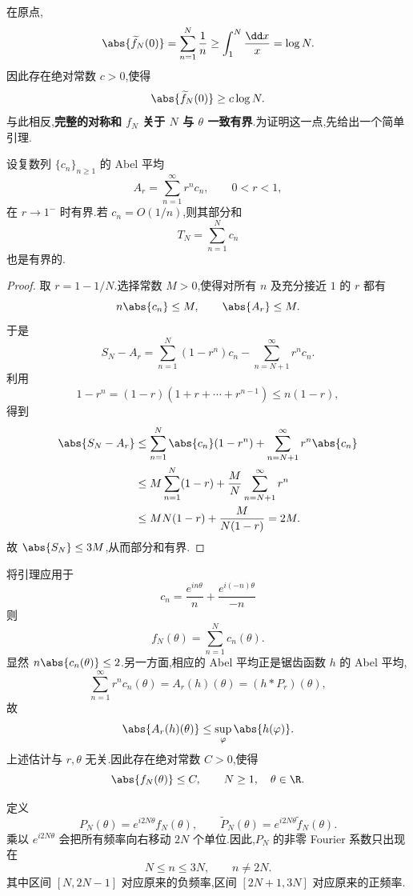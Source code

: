 在原点,
\[
\abs{\widetilde f_N(0)}
=
\sum_{n=1}^{N}\frac1n
\geq
\int_1^N\frac{\dd x}{x}
=
\log N.
\]
因此存在绝对常数 $c>0$,使得
\begin{equation}\label{eq:one-sided-log-growth}
	\abs{\widetilde f_N(0)}\geq c\log N.
\end{equation}
与此相反,\textbf{完整的对称和 $f_N$ 关于 $N$ 与 $\theta$ 一致有界}.为证明这一点,先给出一个简单引理.

\begin{lemma}
	设复数列 $\{c_n\}_{n\geq1}$ 的 Abel 平均
	\[
	A_r=\sum_{n=1}^{\infty}r^nc_n,
	\qquad 0<r<1,
	\]
	在 $r\to1^-$ 时有界.若 $c_n=O(1/n)$,则其部分和
	\[
	T_N=\sum_{n=1}^{N}c_n
	\]
	也是有界的.
\end{lemma}

\begin{proof}
	取 $r=1-1/N$.选择常数 $M>0$,使得对所有 $n$ 及充分接近 $1$ 的 $r$ 都有
	\[
	n\abs{c_n}\leq M,
	\qquad
	\abs{A_r}\leq M.
	\]
	于是
	\[
	S_N-A_r
	=
	\sum_{n=1}^{N}(1-r^n)c_n
	-
	\sum_{n=N+1}^{\infty}r^nc_n.
	\]
	利用
	\[
	1-r^n=(1-r)(1+r+\cdots+r^{n-1})\leq n(1-r),
	\]
	得到
	\[
	\begin{aligned}
		\abs{S_N-A_r}
		&\leq
		\sum_{n=1}^{N}\abs{c_n}(1-r^n)
		+
		\sum_{n=N+1}^{\infty}r^n\abs{c_n}\\
		&\leq
		M\sum_{n=1}^{N}(1-r)
		+
		\frac{M}{N}\sum_{n=N+1}^{\infty}r^n\\
		&\leq
		MN(1-r)+\frac{M}{N(1-r)}
		=2M.
	\end{aligned}
	\]
	故 $\abs{S_N}\leq3M$,从而部分和有界.
\end{proof}

将引理应用于
\[c_n=\frac{e^{in\theta}}{n}+\frac{e^{i(-n)\theta}}{-n}\]
则
\[
f_N(\theta)=\sum_{n=1}^{N}c_n(\theta).
\]
显然 $n\abs{c_n(\theta)}\leq2$.另一方面,相应的 Abel 平均正是锯齿函数 $h$ 的 Abel 平均,
\[
\sum_{n=1}^{\infty}r^nc_n(\theta)
=A_r(h)(\theta)
=(h\ast P_r)(\theta),
\]
故
\[
\abs{A_r(h)(\theta)}\leq\sup_{\varphi}\abs{h(\varphi)}.
\]
上述估计与 $r,\theta$ 无关.因此存在绝对常数 $C>0$,使得
\begin{equation}\label{eq:fN-uniform-bound}
	\abs{f_N(\theta)}\leq C,
	\qquad N\geq1,\quad\theta\in\R.
\end{equation}



定义
\begin{equation}\label{eq:shifted-blocks}
	P_N(\theta)=e^{i2N\theta}f_N(\theta),
	\qquad
	\widetilde P_N(\theta)=e^{i2N\theta}\widetilde f_N(\theta).
\end{equation}
乘以 $e^{i2N\theta}$ 会把所有频率向右移动 $2N$ 个单位.因此,$P_N$ 的非零 Fourier 系数只出现在
\[
N\leq n\leq3N,
\qquad n\neq2N.
\]
其中区间 $[N,2N-1]$ 对应原来的负频率,区间 $[2N+1,3N]$ 对应原来的正频率.

